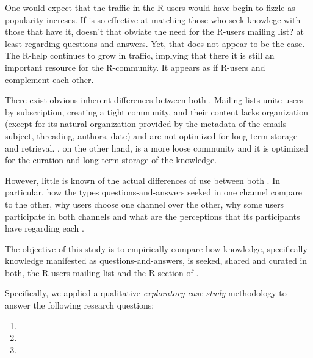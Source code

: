 One would expect that the traffic in the R-users \ml would have begin to fizzle as \SO popularity increses. If \SO is so effective at matching those who seek
knowlege with those that have it, doesn't that obviate the need for the R-users mailing list? at least regarding questions and answers. Yet, that does not appear
to be the case. The R-help \ml continues to grow in traffic, implying that there it is still an important resource for the R-community. It appears as if R-users
and \SO complement each other.

There exist obvious inherent differences between both \channels. Mailing lists unite users by subscription, creating a tight community, and their content lacks
organization (except for its natural organization provided by the metadata of the emails---subject, threading, authors, date) and are not optimized for long
term storage and retrieval.  \SO, on the other hand, is a more loose community and it is optimized for the curation and long term storage of the knowledge.

However, little is known of the actual differences of use between both \channels. 
In particular, how the types questions-and-answers seeked in one channel compare to
the other, why users choose one channel over the other, why some users participate in both channels and what are the perceptions that its participants have
regarding each \channel.

The objective of this study is to empirically compare how knowledge, specifically knowledge manifested as questions-and-answers, is seeked, shared and curated in both, the R-users mailing list and the R section of \SO.

Specifically, we applied a qualitative \textit{exploratory case study} methodology to answer the following research questions:

\begin{enumerate}[label=\bfseries{RQ-\arabic*.},itemsep=3pt, topsep=2pt, leftmargin=3em, parsep=0pt]
        \item \rqa
        \item \rqb
        \item \rqc
    \end{enumerate}




